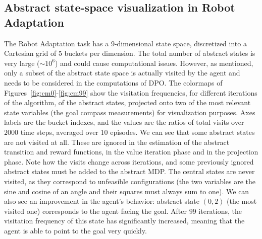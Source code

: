 \subsection{Abstract state-space visualization in Robot Adaptation}
The Robot Adaptation task has a $9$-dimensional state space, discretized into a Cartesian grid of $5$ buckets per dimension. The total number of abstract states is very large ($\sim 10^{6}$) and could cause computational issues. However, as mentioned, only a subset of the abstract state space is actually visited by the agent and needs to be considered in the computations of \ac{DPO}. The colormaps of Figures~\ref{fig:cm0}-\ref{fig:cm99} show the visitation frequencies, for different iterations of the algorithm, of the abstract states, projected onto two of the most relevant state variables (the goal compass measurements) for visualization purposes. Axes labels are the bucket indexes, and the values are the ratios of total visits over $2000$ time steps, averaged over $10$ episodes. We can see that some abstract states are not visited at all. These are ignored in the estimation of the abstract transition and reward functions, in the value iteration phase and in the projection phase. Note how the visits change across iterations, and some previously ignored abstract states must be added to the abstract \ac{MDP}. The central states are never visited, as they correspond to unfeasible configurations (the two variables are the sine and cosine of an angle and their squares must always sum to one). We can also see an improvement in the agent's behavior: abstract state $(0,2)$ (the most visited one) corresponds to the agent facing the goal. After $99$ iterations, the visitation frequency of this state has significantly increased, meaning that the agent is able to point to the goal very quickly.

